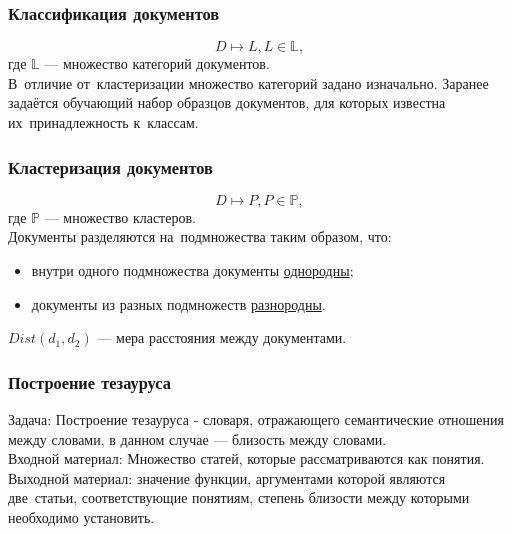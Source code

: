 \documentclass{beamer}
\begin{document}
\begin{frame}
\frametitle{Классификация документов}
$$D \mapsto L, L \in \mathbb{L},$$
\vspace{1cm}
где $\mathbb{L}$ --- множество категорий документов.\\
\vspace{1cm}
В~отличие от~кластеризации множество категорий задано изначально.
\vspace{1cm}
Заранее задаётся обучающий набор образцов документов, для которых известна их~принадлежность к~классам.
\end{frame}

\begin{frame}
\frametitle{Кластеризация документов}
$$D \mapsto P, P \in \mathbb{P},$$
\vspace{1cm}
где $\mathbb{P}$ --- множество кластеров.\\
\vspace{1cm}
Документы разделяются на~подмножества таким образом, что:

\begin{itemize}
\item{внутри одного подмножества документы \underline{однородны};}
\item{документы из разных подмножеств \underline{разнородны}.}
\end{itemize}
\vspace{1cm}
$Dist(d_{1},d_{2})$ --- мера расстояния между документами.
\end{frame}

\begin {frame}
\frametitle{Построение тезауруса}
Задача: Построение тезауруса - словаря, отражающего семантические отношения
между словами, в данном случае --- близость между словами.\\
\vspace{1cm}
Входной материал: Множество статей, которые рассматриваются как понятия.\\
\vspace{1cm}
Выходной материал: значение функции, аргументами которой являются две~статьи, 
соответствующие понятиям, степень близости между которыми необходимо установить.
\end{frame}
\end{document}
